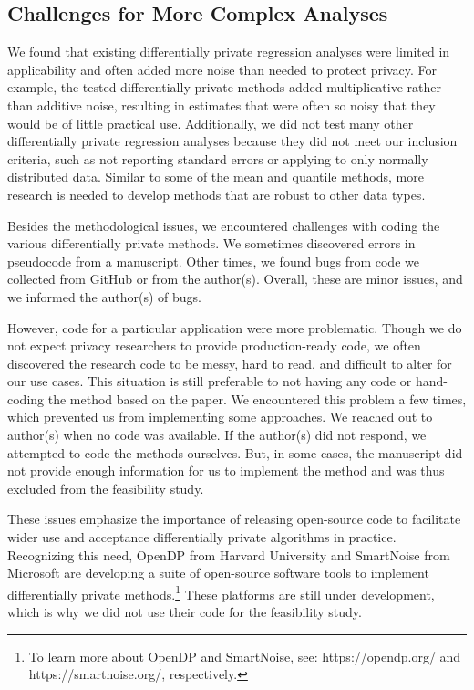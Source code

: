 \subsection{Challenges for More Complex Analyses}
We found that existing differentially private regression analyses were limited in applicability and often added more noise than needed to protect privacy. For example, the tested differentially private methods added multiplicative rather than additive noise, resulting in estimates that were often so noisy that they would be of little practical use. Additionally, we did not test many other differentially private regression analyses because they did not meet our inclusion criteria, such as not reporting standard errors or applying to only normally distributed data. Similar to some of the mean and quantile methods, more research is needed to develop methods that are robust to other data types.

Besides the methodological issues, we encountered challenges with coding the various differentially private methods. We sometimes discovered errors in pseudocode from a manuscript. Other times, we found bugs from code we collected from GitHub or from the author(s). Overall, these are minor issues, and we informed the author(s) of bugs.

However, code for a particular application were more problematic. Though we do not expect privacy researchers to provide production-ready code, we often discovered the research code to be messy, hard to read, and difficult to alter for our use cases. This situation is still preferable to not having any code or hand-coding the method based on the paper. We encountered this problem a few times, which prevented us from implementing some approaches. We reached out to author(s) when no code was available. If the author(s) did not respond, we attempted to code the methods ourselves. But, in some cases, the manuscript did not provide enough information for us to implement the method and was thus excluded from the feasibility study.

These issues emphasize the importance of releasing open-source code to facilitate wider use and acceptance differentially private algorithms in practice. Recognizing this need, OpenDP from Harvard University and SmartNoise from Microsoft are developing a suite of open-source software tools to implement differentially private methods.\footnote{To learn more about OpenDP and SmartNoise, see: https://opendp.org/ and https://smartnoise.org/, respectively.} These platforms are still under development, which is why we did not use their code for the feasibility study.

